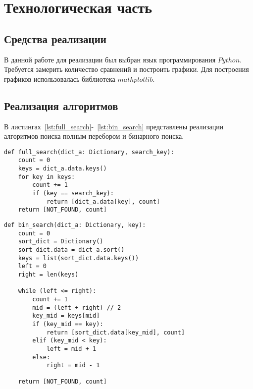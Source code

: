 \chapter{Технологическая часть}

\section{Средства реализации}

В данной работе для реализации был выбран язык программирования $Python$. Требуется замерить количество сравнений и построить графики. Для построения графиков использовалась библиотека $mathplotlib$.

\section{Реализация алгоритмов}

В листингах~\ref{lst:full_search}-~\ref{lst:bin_search} представлены реализации алгоритмов поиска полным перебором и бинарного поиска.
\begin{center}
    \captionsetup{justification=raggedright,singlelinecheck=off}
    \begin{lstlisting}[label=lst:full_search,caption=Алгоритм поиска в словаре полным перебором]
def full_search(dict_a: Dictionary, search_key):
	count = 0
	keys = dict_a.data.keys()
	for key in keys:
		count += 1
		if (key == search_key):
			return [dict_a.data[key], count]
	return [NOT_FOUND, count] 
\end{lstlisting}
\end{center}

\clearpage

\begin{center}
    \captionsetup{justification=raggedright,singlelinecheck=off}
    \begin{lstlisting}[label=lst:bin_search,caption=Алгоритм бинарного поиска]
def bin_search(dict_a: Dictionary, key):
	count = 0
	sort_dict = Dictionary()
	sort_dict.data = dict_a.sort()
	keys = list(sort_dict.data.keys())
	left = 0 
	right = len(keys)

	while (left <= right):         
		count += 1                  
		mid = (left + right) // 2   
		key_mid = keys[mid]         
		if (key_mid == key):        
			return [sort_dict.data[key_mid], count] 
		elif (key_mid < key):      
			left = mid + 1          
		else:
			right = mid - 1         

	return [NOT_FOUND, count]
\end{lstlisting}
\end{center}

